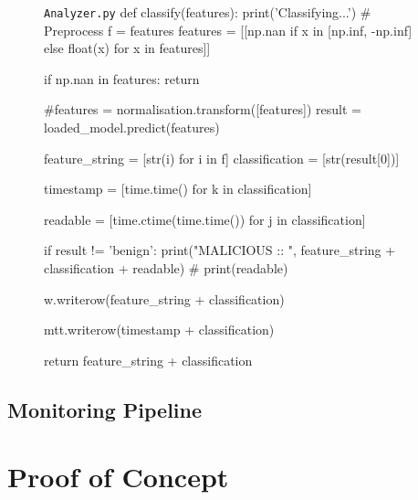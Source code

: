 \begin{figure}[h!]
    \begin{code}[colback=white]{\texttt{Analyzer.py}}
def classify(features):
print('Classifying...')
# Preprocess
f = features
features = [[np.nan if x in [np.inf, -np.inf]
                else float(x) for x in features]]

if np.nan in features:
    return

#features = normalisation.transform([features])
result = loaded_model.predict(features)

feature_string = [str(i) for i in f]
classification = [str(result[0])]

timestamp = [time.time() for k in classification]

readable = [time.ctime(time.time()) for j in classification]

if result != 'benign':
    print("MALICIOUS :: ", feature_string + classification + readable)
    # print(readable)

w.writerow(feature_string + classification)

mtt.writerow(timestamp + classification)

return feature_string + classification
\end{code}
\end{figure}


\subsection{Monitoring Pipeline}
\label{subsec:monitoring-pipeline}

\textcolor{dimgray}{\lipsum[1-2]}


\section{Proof of Concept}
\label{sec:poc}

\textcolor{dimgray}{\lipsum}

